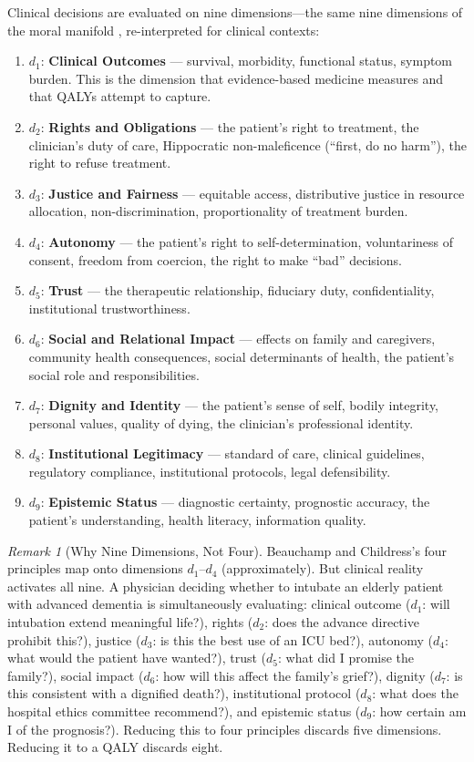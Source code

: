 \documentclass[12pt]{article}
\theoremstyle{definition}
\theoremstyle{remark}
\newtheorem{remark}[theorem]{Remark}
\begin{document}
Clinical decisions are evaluated on nine dimensions---the same nine dimensions of the moral manifold \cite{bond2026geometric}, re-interpreted for clinical contexts:

\begin{enumerate}
    \item $d_1$: \textbf{Clinical Outcomes} --- survival, morbidity, functional status, symptom burden.  This is the dimension that evidence-based medicine measures and that QALYs attempt to capture.
    \item $d_2$: \textbf{Rights and Obligations} --- the patient's right to treatment, the clinician's duty of care, Hippocratic non-maleficence (``first, do no harm''), the right to refuse treatment.
    \item $d_3$: \textbf{Justice and Fairness} --- equitable access, distributive justice in resource allocation, non-discrimination, proportionality of treatment burden.
    \item $d_4$: \textbf{Autonomy} --- the patient's right to self-determination, voluntariness of consent, freedom from coercion, the right to make ``bad'' decisions.
    \item $d_5$: \textbf{Trust} --- the therapeutic relationship, fiduciary duty, confidentiality, institutional trustworthiness.
    \item $d_6$: \textbf{Social and Relational Impact} --- effects on family and caregivers, community health consequences, social determinants of health, the patient's social role and responsibilities.
    \item $d_7$: \textbf{Dignity and Identity} --- the patient's sense of self, bodily integrity, personal values, quality of dying, the clinician's professional identity.
    \item $d_8$: \textbf{Institutional Legitimacy} --- standard of care, clinical guidelines, regulatory compliance, institutional protocols, legal defensibility.
    \item $d_9$: \textbf{Epistemic Status} --- diagnostic certainty, prognostic accuracy, the patient's understanding, health literacy, information quality.
\end{enumerate}

\begin{remark}[Why Nine Dimensions, Not Four]
Beauchamp and Childress's four principles map onto dimensions $d_1$--$d_4$ (approximately).  But clinical reality activates all nine.  A physician deciding whether to intubate an elderly patient with advanced dementia is simultaneously evaluating: clinical outcome ($d_1$: will intubation extend meaningful life?), rights ($d_2$: does the advance directive prohibit this?), justice ($d_3$: is this the best use of an ICU bed?), autonomy ($d_4$: what would the patient have wanted?), trust ($d_5$: what did I promise the family?), social impact ($d_6$: how will this affect the family's grief?), dignity ($d_7$: is this consistent with a dignified death?), institutional protocol ($d_8$: what does the hospital ethics committee recommend?), and epistemic status ($d_9$: how certain am I of the prognosis?).  Reducing this to four principles discards five dimensions.  Reducing it to a QALY discards eight.
\end{remark}
\end{document}
